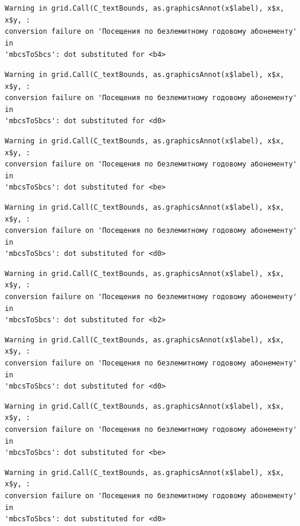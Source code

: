 \documentclass[
  letterpaper,
  DIV=11,
  numbers=noendperiod]{scrartcl}
\begin{document}
\begin{verbatim}
Warning in grid.Call(C_textBounds, as.graphicsAnnot(x$label), x$x, x$y, :
conversion failure on 'Посещения по безлемитному годовому абонементу' in
'mbcsToSbcs': dot substituted for <b4>
\end{verbatim}

\begin{verbatim}
Warning in grid.Call(C_textBounds, as.graphicsAnnot(x$label), x$x, x$y, :
conversion failure on 'Посещения по безлемитному годовому абонементу' in
'mbcsToSbcs': dot substituted for <d0>
\end{verbatim}

\begin{verbatim}
Warning in grid.Call(C_textBounds, as.graphicsAnnot(x$label), x$x, x$y, :
conversion failure on 'Посещения по безлемитному годовому абонементу' in
'mbcsToSbcs': dot substituted for <be>
\end{verbatim}

\begin{verbatim}
Warning in grid.Call(C_textBounds, as.graphicsAnnot(x$label), x$x, x$y, :
conversion failure on 'Посещения по безлемитному годовому абонементу' in
'mbcsToSbcs': dot substituted for <d0>
\end{verbatim}

\begin{verbatim}
Warning in grid.Call(C_textBounds, as.graphicsAnnot(x$label), x$x, x$y, :
conversion failure on 'Посещения по безлемитному годовому абонементу' in
'mbcsToSbcs': dot substituted for <b2>
\end{verbatim}

\begin{verbatim}
Warning in grid.Call(C_textBounds, as.graphicsAnnot(x$label), x$x, x$y, :
conversion failure on 'Посещения по безлемитному годовому абонементу' in
'mbcsToSbcs': dot substituted for <d0>
\end{verbatim}

\begin{verbatim}
Warning in grid.Call(C_textBounds, as.graphicsAnnot(x$label), x$x, x$y, :
conversion failure on 'Посещения по безлемитному годовому абонементу' in
'mbcsToSbcs': dot substituted for <be>
\end{verbatim}

\begin{verbatim}
Warning in grid.Call(C_textBounds, as.graphicsAnnot(x$label), x$x, x$y, :
conversion failure on 'Посещения по безлемитному годовому абонементу' in
'mbcsToSbcs': dot substituted for <d0>
\end{verbatim}
\end{document}
